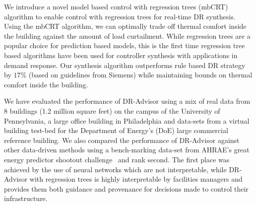 We introduce a novel model based control with regression trees (mbCRT) algorithm to enable control with regression trees for real-time DR synthesis. Using the mbCRT algorithm, we can optimally trade off thermal comfort inside the building against the amount of load curtailment. 
While regression trees are a popular choice for prediction based models, this is the first time regression tree based algorithms have been used for controller synthesis with applications in demand response. Our synthesis algorithm outperforms rule based DR strategy by $17\%$ (based on guidelines from Siemens) while maintaining bounds on thermal comfort inside the building.\vspace{4pt}

We have evaluated the performance of DR-Advisor using a mix of real data from 8 buildings (1.2 million square feet) on the campus of the University of Pennsylvania, a large office building in Philadelphia and data-sets from a virtual building test-bed for the Department of Energy's (DoE) large commercial reference building.
We also compared the performance of DR-Advisor against other data-driven methods using a bench-marking data-set from AHRAE's great energy predictor shootout challenge~\cite{kreider1994predicting} and rank second. The first place was achieved by the use of neural networks which are not interpretable, while DR-Advisor with regression trees is highly interpretable by facilities managers and provides them both guidance and provenance for decisions made to control their infrastructure.

